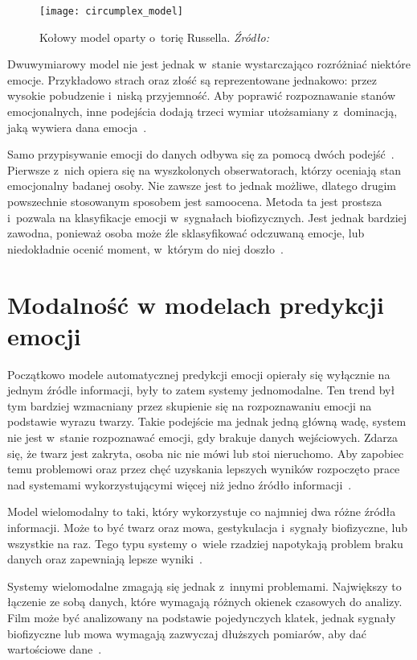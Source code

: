 \begin{figure}[h]
    \centering
    \texttt{[image: circumplex\_model]}
    \caption{Kołowy model oparty o~torię Russella. \textit{Źródło:~\cite{Dzedzickis2020}}}
    \label{fig:circumplex-model}
\end{figure}

Dwuwymiarowy model nie jest jednak w~stanie wystarczająco rozróżniać niektóre emocje.
Przykładowo strach oraz złość są reprezentowane jednakowo: przez wysokie pobudzenie i~niską przyjemność.
Aby poprawić rozpoznawanie stanów emocjonalnych, inne podejścia dodają trzeci wymiar utożsamiany z~dominacją, jaką wywiera dana emocja~\cite{Calvo2015}.

Samo przypisywanie emocji do danych odbywa się za pomocą dwóch podejść~\cite{Calvo2015}.
Pierwsze z~nich opiera się na wyszkolonych obserwatorach, którzy oceniają stan emocjonalny badanej osoby.
Nie zawsze jest to jednak możliwe, dlatego drugim powszechnie stosowanym sposobem jest samoocena.
Metoda ta jest prostsza i~pozwala na klasyfikacje emocji w~sygnałach biofizycznych.
Jest jednak bardziej zawodna, ponieważ osoba może źle sklasyfikować odczuwaną emocje, lub niedokładnie ocenić moment, w~którym do niej doszło~\cite{Calvo2015}.

\section{Modalność w modelach predykcji emocji}\label{sec:modalnosc-w-modelach-predykcji-emocji}

Początkowo modele automatycznej predykcji emocji opierały się wyłącznie na jednym źródle informacji, były to zatem systemy jednomodalne.
Ten trend był tym bardziej wzmacniany przez skupienie się na rozpoznawaniu emocji na podstawie wyrazu twarzy.
Takie podejście ma jednak jedną główną wadę, system nie jest w~stanie rozpoznawać emocji, gdy brakuje danych wejściowych.
Zdarza się, że twarz jest zakryta, osoba nic nie mówi lub stoi nieruchomo.
Aby zapobiec temu problemowi oraz przez chęć uzyskania lepszych wyników rozpoczęto prace nad systemami wykorzystującymi więcej niż jedno źródło informacji~\cite{Calvo2015}.

Model wielomodalny to taki, który wykorzystuje co najmniej dwa różne źródła informacji.
Może to być twarz oraz mowa, gestykulacja i~sygnały biofizyczne, lub wszystkie na raz.
Tego typu systemy o~wiele rzadziej napotykają problem braku danych oraz zapewniają lepsze wyniki~\cite{DMello2012}.

Systemy wielomodalne zmagają się jednak z~innymi problemami.
Największy to łączenie ze sobą danych, które wymagają różnych okienek czasowych do analizy.
Film może być analizowany na podstawie pojedynczych klatek, jednak sygnały biofizyczne lub mowa wymagają zazwyczaj dłuższych pomiarów, aby dać wartościowe dane~\cite{Calvo2015}.

